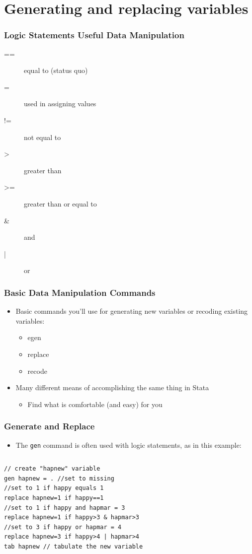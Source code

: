 \documentclass[table]{beamer}
\begin{document}
\section{Generating and replacing variables}
\label{sec-2}
\begin{frame}
\frametitle{Logic Statements Useful Data Manipulation}
\label{sec-2-1}


\begin{description}
\item[==] equal to (status quo)
\item[=] used in assigning values
\item[!=] not equal to
\item[>] greater than
\item[>=] greater than or equal to
\item[\&] and
\item[|] or
\end{description}
     
\end{frame}
\begin{frame}
\frametitle{Basic Data Manipulation Commands}
\label{sec-2-2}

\begin{itemize}
\item Basic commands you'll use for generating new variables or recoding existing variables:
\begin{itemize}
\item egen
\item replace
\item recode
\end{itemize}
\item Many different means of accomplishing the same thing in Stata
\begin{itemize}
\item Find what is comfortable (and easy) for you
\end{itemize}
\end{itemize}
\end{frame}
\begin{frame}[fragile]
\frametitle{Generate and Replace}
\label{sec-2-3}

\begin{itemize}
\item The \verb~gen~ command is often used with logic statements, as in this example:
\end{itemize}
\vspace{-.5em} \begin{columns}  \begin{block}{}

\begin{verbatim}
// create "hapnew" variable
gen hapnew = . //set to missing
//set to 1 if happy equals 1
replace hapnew=1 if happy==1 
//set to 1 if happy and hapmar = 3
replace hapnew=1 if happy>3 & hapmar>3
//set to 3 if happy or hapmar = 4
replace hapnew=3 if happy>4 | hapmar>4
tab hapnew // tabulate the new variable
\end{verbatim}
\end{block} \end{columns}
\end{frame}
\end{document}
